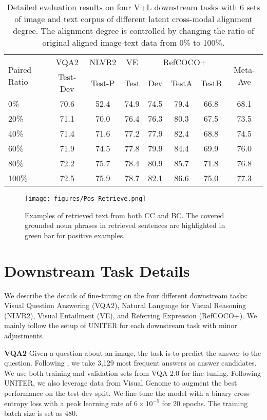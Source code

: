 \begin{table*}[!ht]\centering
\small
\begin{tabular}{l|c|c|c|ccc|c}\toprule
\multirow{2}{*}{ Paired Ratio } &VQA2 &NLVR2 &VE & \multicolumn{3}{c|}{RefCOCO+} & \multirow{2}{*}{ Meta-Ave } \\
&Test-Dev &Test-P &Test &Dev &TestA &TestB & \\\cmidrule{1-8}
0\% &70.6 &52.4 &74.9 &74.5 &79.4 &66.8 & 68.1 \\
20\% &71.1 &70.0 &76.4 & 76.3 &80.3 &67.5 & 73.5 \\
40\% &71.4 &71.6 &77.2 &77.9 &82.4 &68.8 & 74.5 \\
60\% &71.9 &74.5 &77.8 &79.9 &84.4 &69.9 & 76.0 \\
80\% &72.2 &75.7 &78.4 &80.9 &85.7 &71.8 & 76.8 \\
100\% &72.5 &75.9 &78.7 &82.1 &86.6 &75.0 & 77.3 \\
\bottomrule
\end{tabular}
\vspace{-0.3cm}
\caption{Detailed evaluation results on four V+L downstream tasks with 6 sets of image and text corpus of different latent cross-modal alignment degree. The alignment degree is controlled by changing the ratio of original aligned image-text data from 0\% to 100\%.}
\label{tab:paired-ratio}
\end{table*}


\begin{figure*}[h!]
\centering
\texttt{[image: figures/Pos\_Retrieve.png]}
\vspace{-0.3cm}
\caption{Examples of retrieved text from both CC and BC. The covered grounded noun phrases in retrieved sentences are highlighted in green bar for positive examples.}
\label{fig:pos-ret}
\end{figure*}

\section{Downstream Task Details}
We describe the details of fine-tuning on the four different downstream tasks: Visual Question Answering (VQA2), Natural Language for Visual Reasoning (NLVR2), Visual Entailment (VE), and Referring Expression (RefCOCO+). We mainly follow the setup of UNITER\cite{chen2020uniter} for each downstream task with minor adjustments.  

\noindent\textbf{VQA2}
Given a question about an image, the task is to predict the answer to the question. Following \cite{yu2019mcan}, we take 3,129 most frequent answers as answer candidates. We use both training and validation sets from VQA 2.0 for fine-tuning. Following UNITER, we also leverage data from Visual Genome\cite{krishna2017visualgenome} to augment the best performance on the test-dev split. We fine-tune the model with a binary cross-entropy loss with a peak learning rate of $6\times10^{-5}$ for 20 epochs. The training batch size is set as 480. 

